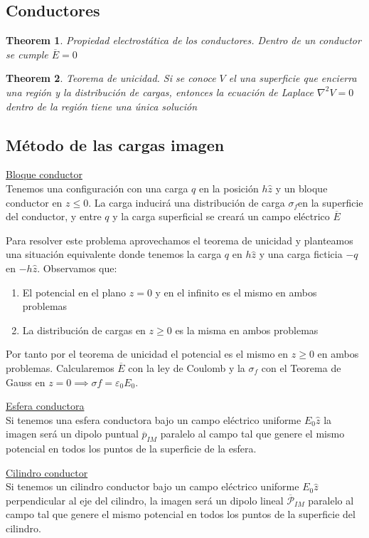 \documentclass{myclass}
\newtheorem*{theorem}{Theorem}
\begin{document}
\subsection{Conductores}
\begin{theorem}
Propiedad electrostática de los conductores. Dentro de un conductor se cumple $\boxed{\overline{E}=0}$ 
\end{theorem}

\begin{theorem}
Teorema de unicidad. Si se conoce $V$ el una superficie que encierra una región y la distribución de cargas, entonces la ecuación de Laplace $\nabla ^2V=0$ dentro de la región tiene una única solución
\end{theorem}

\subsection{Método de las cargas imagen}
\underline{Bloque conductor}\\
Tenemos una configuración con una carga $q$ en la posición  $h\hat{z}$ y un bloque conductor en $z\le 0$. La carga inducirá una distribución de carga $\sigma_f $en la superficie del conductor, y entre $q$ y la carga superficial se creará un campo eléctrico $\overline{E}$

Para resolver este problema aprovechamos el teorema de unicidad y planteamos una situación equivalente donde tenemos la carga $q$ en  $h\hat{z}$ y una carga ficticia $-q$ en $-h\hat{z}$. Observamos que:
\begin{enumerate}[topsep=0pt, itemsep=0pt]
  \item El potencial en el plano $z=0$ y en el infinito es el mismo en ambos problemas
  \item La distribución de cargas en $z\ge 0$ es la misma en ambos problemas
\end{enumerate}
Por tanto por el teorema de unicidad el potencial es el mismo en $z\ge 0$ en ambos problemas. Calcularemos $\overline{E}$ con la ley de Coulomb y la $\sigma _f$ con el Teorema de Gauss en $z=0 \implies \sigma f=\varepsilon _0 E_0$.

\underline{Esfera conductora} \\
Si tenemos una esfera conductora bajo un campo eléctrico uniforme $E_0\hat{z}$ la imagen será un dipolo puntual $\overline{p}_{IM}$ paralelo al campo tal que genere el mismo potencial en todos los puntos de la superficie de la esfera.

\underline{Cilindro conductor} \\
Si tenemos un cilindro conductor bajo un campo eléctrico uniforme $E_0\hat{z}$ perpendicular al eje del cilindro, la imagen será un dipolo lineal $\overline{\mathcal{P}}_{IM}$ paralelo al campo tal que genere el mismo potencial en todos los puntos de la superficie del cilindro.
\end{document}
